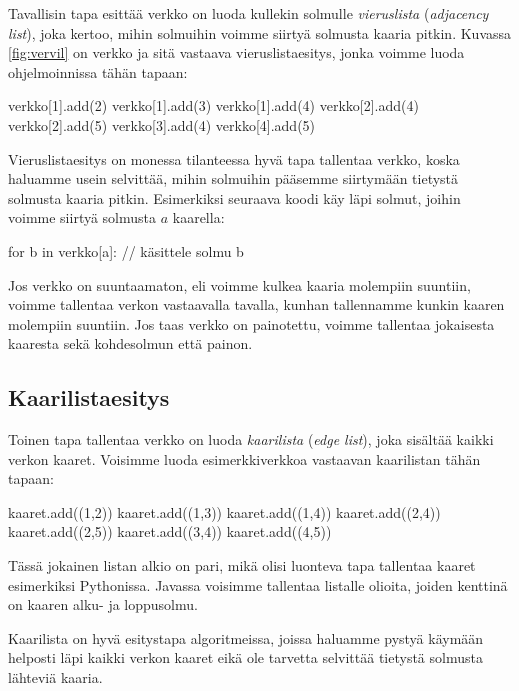 Tavallisin tapa esittää verkko on luoda kullekin solmulle
\emph{vieruslista} (\emph{adjacency list}), joka kertoo, mihin solmuihin voimme
siirtyä solmusta kaaria pitkin.
Kuvassa \ref{fig:vervil} on verkko
ja sitä vastaava vieruslistaesitys,
jonka voimme luoda ohjelmoinnissa tähän tapaan:

\begin{code}
verkko[1].add(2)
verkko[1].add(3)
verkko[1].add(4)
verkko[2].add(4)
verkko[2].add(5)
verkko[3].add(4)
verkko[4].add(5)
\end{code}

Vieruslistaesitys on monessa tilanteessa hyvä tapa tallentaa verkko,
koska haluamme usein selvittää,
mihin solmuihin pääsemme siirtymään tietystä solmusta kaaria pitkin.
Esimerkiksi seuraava koodi käy läpi solmut,
joihin voimme siirtyä solmusta $a$ kaarella:

\begin{code}
for b in verkko[a]:
    // käsittele solmu b
\end{code}

Jos verkko on suuntaamaton, eli voimme kulkea kaaria molempiin suuntiin,
voimme tallentaa verkon vastaavalla tavalla,
kunhan tallennamme kunkin kaaren molempiin suuntiin.
Jos taas verkko on painotettu, voimme tallentaa jokaisesta
kaaresta sekä kohdesolmun että painon.

\subsection{Kaarilistaesitys}


Toinen tapa tallentaa verkko on luoda \emph{kaarilista}
(\emph{edge list}),
joka sisältää kaikki verkon kaaret.
Voisimme luoda esimerkkiverkkoa vastaavan kaarilistan
tähän tapaan:

\begin{code}
kaaret.add((1,2))
kaaret.add((1,3))
kaaret.add((1,4))
kaaret.add((2,4))
kaaret.add((2,5))
kaaret.add((3,4))
kaaret.add((4,5))
\end{code}

Tässä jokainen listan alkio on pari, mikä olisi luonteva
tapa tallentaa kaaret esimerkiksi Pythonissa.
Javassa voisimme tallentaa listalle olioita,
joiden kenttinä on kaaren alku- ja loppusolmu.

Kaarilista on hyvä esitystapa algoritmeissa,
joissa haluamme pystyä käy\-mään helposti läpi
kaikki verkon kaaret eikä ole tarvetta
selvittää tietystä solmusta lähteviä kaaria.

